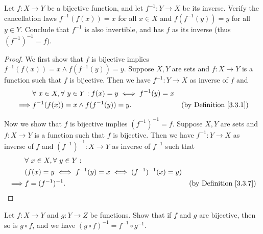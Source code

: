 \begin{exercise}\label{ex 3.3.6}
    Let \(f : X \to Y\) be a bijective function, and let \(f^{-1} : Y \to X\) be its inverse.
    Verify the cancellation laws \(f^{-1}(f(x)) = x\) for all \(x \in X\) and \(f(f^{-1}(y)) = y\) for all \(y \in Y\).
    Conclude that \(f^{-1}\) is also invertible, and has \(f\) as its inverse (thus \((f^{-1})^{-1} = f\)).
\end{exercise}

\begin{proof}
    We first show that \(f\) is bijective implies \(f^{-1}(f(x)) = x \land f(f^{-1}(y)) = y\).
    Suppose \(X, Y\) are sets and \(f : X \to Y\) is a function such that \(f\) is bijective.
    Then we have \(f^{-1} : Y \to X\) as inverse of \(f\) and
    \begin{align*}
                 & \forall\ x \in X, \forall\ y \in Y : f(x) = y \iff f^{-1}(y) = x                                      \\
        \implies & f^{-1}(f(x)) = x \land f(f^{-1}(y)) = y.                         & \text{(by Definition \ref{3.3.1})}
    \end{align*}

    Now we show that \(f\) is bijective implies \((f^{-1})^{-1} = f\).
    Suppose \(X, Y\) are sets and \(f : X \to Y\) is a function such that \(f\) is bijective.
    Then we have \(f^{-1} : Y \to X\) as inverse of \(f\) and \((f^{-1})^{-1} : X \to Y\) as inverse of \(f^{-1}\) such that
    \begin{align*}
                 & \forall\ x \in X, \forall\ y \in Y :                                                         \\
                 & (f(x) = y \iff f^{-1}(y) = x \iff (f^{-1})^{-1}(x) = y)                                      \\
        \implies & f = (f^{-1})^{-1}.                                      & \text{(by Definition \ref{3.3.7})}
    \end{align*}
\end{proof}

\begin{exercise}\label{ex 3.3.7}
    Let \(f : X \to Y\) and \(g : Y \to Z\) be functions.
    Show that if \(f\) and \(g\) are bijective, then so is \(g \circ f\), and we have \((g \circ f)^{-1} = f^{-1} \circ g^{-1}\).
\end{exercise}

